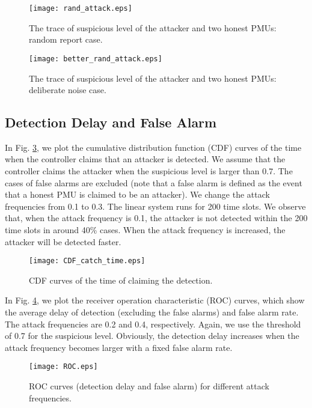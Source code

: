 \documentclass[journal,10pt,twocolumn]{IEEEtran}
\begin{document}
\begin{figure}
  \centering
  \texttt{[image: rand\_attack.eps]}
  \caption{The trace of suspicious level of the attacker and two honest PMUs: random report case.}\label{fig:attack}
\end{figure}

\begin{figure}
  \centering
  \texttt{[image: better\_rand\_attack.eps]}
  \caption{The trace of suspicious level of the attacker and two honest PMUs: deliberate noise case.}\label{fig:attack2}
\end{figure}

\subsection{Detection Delay and False Alarm}
In Fig. \ref{fig:CDF}, we plot the cumulative distribution function (CDF) curves of the time when the controller claims that an attacker is detected. We assume that the controller claims the attacker when the suspicious level is larger than 0.7. The cases of false alarms are excluded (note that a false alarm is defined as the event that a honest PMU is claimed to be an attacker). We change the attack frequencies from 0.1 to 0.3. The linear system runs for 200 time slots. We observe that, when the attack frequency is 0.1, the attacker is not detected within the 200 time slots in around 40\% cases. When the attack frequency is increased, the attacker will be detected faster.

\begin{figure}
  \centering
  \texttt{[image: CDF\_catch\_time.eps]}
  \caption{CDF curves of the time of claiming the detection.}\label{fig:CDF}
\end{figure}

In Fig. \ref{fig:ROC}, we plot the receiver operation characteristic (ROC) curves, which show the average delay of detection (excluding the false alarms) and false alarm rate. The attack frequencies are 0.2 and 0.4, respectively. Again, we use the threshold of 0.7 for the suspicious level. Obviously, the detection delay increases when the attack frequency becomes larger with a fixed false alarm rate.

\begin{figure}
  \centering
  \texttt{[image: ROC.eps]}
  \caption{ROC curves (detection delay and false alarm) for different attack frequencies.}\label{fig:ROC}
\end{figure}
\end{document}
